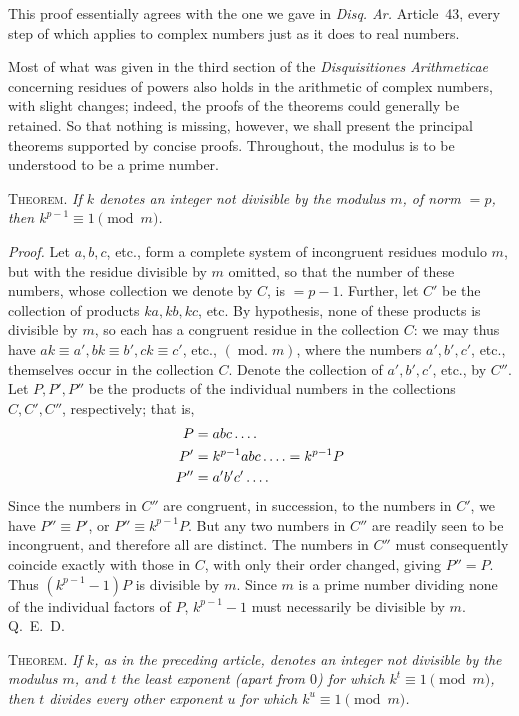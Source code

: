 This proof essentially agrees with the one we gave in \emph{Disq. Ar.} Article~43, every step of which applies to complex numbers just as it does to real numbers.

%
Most of what was given in the third section of the \emph{Disquisitiones Arithmeticae} concerning residues of powers also holds in the arithmetic of complex numbers, with slight changes; indeed, the proofs of the theorems could generally be retained. So that nothing is missing, however, we shall present the principal theorems supported by concise proofs. Throughout, the modulus is to be understood to be a prime number.

\textsc{Theorem.} \emph{If $k$ denotes an integer not divisible by the modulus $m$, of norm $=p$, then $k^{p-1}\equiv1\pmod m$.}

\emph{Proof.} Let $a,b,c$, etc., form a complete system of incongruent residues modulo $m$, but with the residue divisible by $m$ omitted, so that the number of these numbers, whose collection we denote by $C$, is $=p-1$. Further, let $C'$ be the collection of products $ka,kb,kc$, etc. By hypothesis, none of these products is divisible by $m$, so each has a congruent residue in the collection $C$: we may thus have $ak\equiv a',bk\equiv b',ck\equiv c'$, etc., $(\operatorname{mod.}m)$, where the numbers $a',b',c'$, etc., themselves occur in the collection $C$. Denote the collection of $a',b',c'$, etc., by $C''$. Let $P,P',P''$ be the products of the individual numbers in the collections $C,C',C''$, respectively; that is,
\[
\begin{aligned}
P&=abc\mathinner{.\,.\,.\,.}\\
P'&=k^{p-1}abc\mathinner{.\,.\,.\,.}=k^{p-1}P\\
P''&=a'b'c'\mathinner{.\,.\,.\,.}
\end{aligned}
\]
Since the numbers in $C''$ are congruent, in succession, to the numbers in $C'$, we have $P''\equiv P'$, or $P''\equiv k^{p-1}P$. But any two numbers in $C''$ are readily seen to be incongruent, and therefore all are distinct. The numbers in $C''$ must consequently coincide exactly with those in $C$, with only their order changed, giving $P''=P$. Thus $(k^{p-1}-1)P$ is divisible by $m$. Since $m$ is a prime number dividing none of the individual factors of $P$, $k^{p-1}-1$ must necessarily be divisible by $m$. Q.~E.~D.

\textsc{Theorem.} \emph{If $k$, as in the preceding article, denotes an integer not divisible by the modulus $m$, and $t$ the least exponent (apart from $0$) for which $k^t\equiv1\pmod m$, then $t$ divides every other exponent $u$ for which $k^u\equiv1\pmod m$.}

